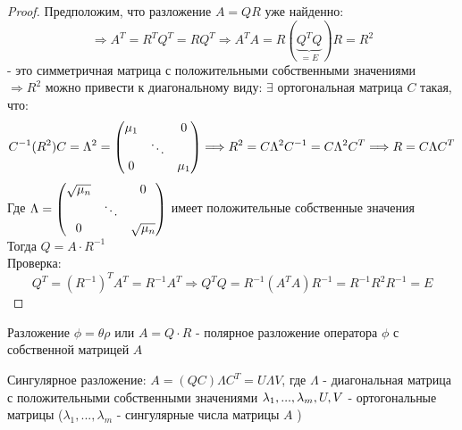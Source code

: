 \begin{proof}
    Предположим, что разложение $A = QR$ уже найденно:
    $$\Longrightarrow A^T = R^TQ^T =RQ^T \Longrightarrow A^TA = R(\underbrace{Q^TQ}_{=E})R = R^2$$ 
    - это симметричная матрица с положительными собственными значениями\\
    $\Longrightarrow R^2$ можно привести к диагональному виду: $\exists$ ортогональная матрица $C$ такая, что:
    $$C^{-1}(R^2)C = \Lambda^2 = \begin{pmatrix}
        \mu_1 & \null & 0\\ \null & \ddots\\ 0 & \null & \mu_1
    \end{pmatrix} \Longrightarrow R^2 = C \Lambda^2C^{-1} = C \Lambda^2 C^T \Longrightarrow R = C \Lambda C^T$$
    Где $\Lambda = \begin{pmatrix}
        \sqrt{\mu_n} & \null & 0\\ \null & \ddots\\ 0 & \null & \sqrt{\mu_n}
    \end{pmatrix}$ имеет положительные собственные значения \\
    Тогда $Q = A \cdot R^{-1}$ \\
    Проверка: 
    $$Q^T = (R^{-1})^TA^T = R^{-1}A^T \Longrightarrow Q^TQ = R^{-1}(A^TA)R^{-1} = R^{-1}R^2R^{-1} = E$$ 
\end{proof}
\begin{definition}
    Разложение $\phi = \theta \rho$  или $A = Q \cdot R$ - полярное разложение оператора $\phi$ с собственной матрицей $A$
\end{definition}
\begin{definition}
    Сингулярное разложение: $A = (QC) \Lambda C^T = U \Lambda V$, где $\Lambda$ - диагональная матрица с положительными собственными значениями $\lambda_1,...,\lambda_m, \\ U,V$ - ортогональные матрицы ($\lambda_1,...,\lambda_m$ - сингулярные числа матрицы $A$ )
\end{definition} 